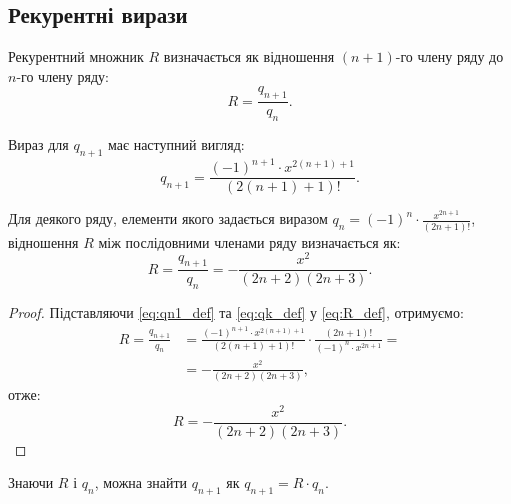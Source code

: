 	\subsection{Рекурентні вирази}
	
	\begin{definition}
		Рекурентний множник \( R \) визначається як відношення \( (n+1) \)-го члену ряду до \( n \)-го члену ряду:
		\begin{equation} \label{eq:R_def}
			R = \frac{q_{n+1}}{q_n}.
		\end{equation}
	\end{definition}
	
	\begin{definition}
		Вираз для \( q_{n+1} \) має наступний вигляд:
		\begin{equation} \label{eq:qn1_def}
			q_{n+1} = \frac{(-1)^{n+1} \cdot x^{2(n+1)+1}}{(2(n+1) + 1)!}.
		\end{equation}
	\end{definition}
	
	\begin{theorem} \label{thm:ratio_test_result}
		Для деякого ряду, елементи якого задається виразом \(q_n = (-1)^n \cdot \frac{x^{2n+1}}{(2n + 1)!}\), відношення \(R\) між послідовними членами ряду визначається як:
		\[
		R = \frac{q_{n+1}}{q_n} = -\frac{x^2}{(2n + 2)(2n + 3)}.
		\]
	\end{theorem}
	
	\begin{proof}
		Підставляючи \eqref{eq:qn1_def} та \eqref{eq:qk_def} у \eqref{eq:R_def}, отримуємо:
		\begin{align*}
			R = \frac{q_{n+1}}{q_n} &= \frac{(-1)^{n+1} \cdot x^{2(n+1)+1}}{(2(n+1) + 1)!} \cdot \frac{(2n + 1)!}{(-1)^n \cdot x^{2n+1}}= \\
			&= -\frac{x^2}{(2n + 2)(2n + 3)},
		\end{align*}
		отже:
		\begin{equation} \label{eq:R_simplified}
			R = -\frac{x^2}{(2n + 2)(2n + 3)}.
		\end{equation}
	\end{proof}
	
	\begin{corollary}
		Знаючи \( R \) і \( q_n \), можна знайти \( q_{n+1} \) як \( q_{n+1} = R \cdot q_n \).
	\end{corollary}
	
	
	
	
	
	
	
	
